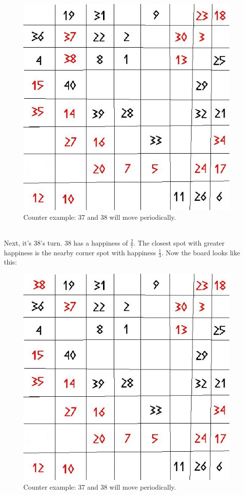 \documentclass{article}
\begin{document}
\begin{figure}[h!]
\begin{center}
\includegraphics[scale=0.25]{segregation_tegenvb_1.jpg}
\end{center}
\caption{Counter example: 37 and 38 will move periodically.}\label{counterexample1}
\end{figure}
\\Next, it's 38's turn. 38 has a happiness of $\frac{2}{7}$. The closest spot with greater happiness is the nearby corner spot with happiness $\frac{1}{3}$. Now the board looks like this:
\begin{figure}[h!]
\begin{center}
\includegraphics[scale=0.25]{segregation_tegenvb_2.jpg}
\end{center}
\caption{Counter example: 37 and 38 will move periodically.}\label{counterexample2}
\end{figure}
\end{document}
